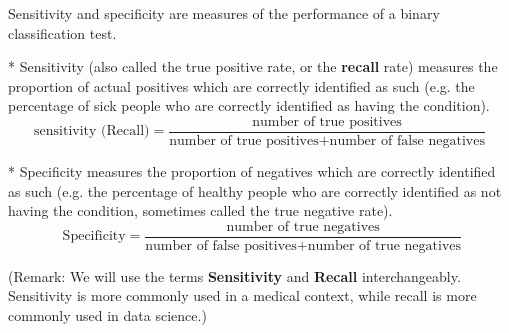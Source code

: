 Sensitivity and specificity are measures of the performance of a binary classification test.


* Sensitivity (also called the true positive rate, or the \textbf{recall} rate) measures the proportion of actual positives which are correctly identified as such (e.g. the percentage of sick people who are correctly identified as having the condition).
    \[ \mbox{sensitivity (Recall)} = \frac{ \mbox{number of true positives} } {\mbox{number of true positives} + \mbox{number of false negatives}} \]

* Specificity measures the proportion of negatives which are correctly identified as such (e.g. the percentage of healthy people who are correctly identified as not having the condition, sometimes called the true negative rate).
    \[ \mbox{ Specificity} = \frac{ \mbox{number of true negatives} } {\mbox{number of false positives} + \mbox{number of true negatives}} \]



(Remark: We will use the terms \textbf{Sensitivity} and \textbf{Recall} interchangeably. Sensitivity is more commonly used in a medical context, while recall is more commonly used in data science.)
